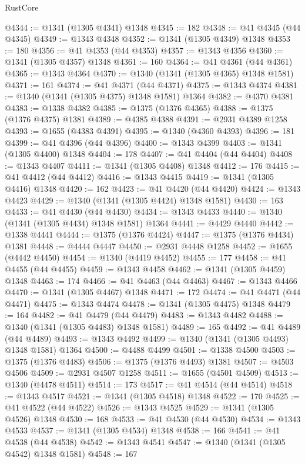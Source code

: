 \begin{lexlean}{RustCore}
\begin{coremodule}
@4344 := @1341 (@1305 @4341) @1348
@4345 := 182
@4348 := @41 @4345 (@44 @4345)
@4349 := @1343 @4348
@4352 := @1341 (@1305 @4349) @1348
@4353 := 180
@4356 := @41 @4353 (@44 @4353)
@4357 := @1343 @4356
@4360 := @1341 (@1305 @4357) @1348
@4361 := 160
@4364 := @41 @4361 (@44 @4361)
@4365 := @1343 @4364
@4370 := @1340 (@1341 (@1305 @4365) @1348 @1581)
@4371 := 161
@4374 := @41 @4371 (@44 @4371)
@4375 := @1343 @4374
@4381 := @1340 (@1341 (@1305 @4375) @1348 @1581) @1364
@4382 := @4370 @4381
@4383 := @1338 @4382
@4385 := @1375 (@1376 @4365)
@4388 := @1375 (@1376 @4375) @1381
@4389 := @4385 @4388
@4391 := @2931 @4389 @1258
@4393 := @1655 (@4383 @4391)
@4395 := @1340 (@4360 @4393)
@4396 := 181
@4399 := @41 @4396 (@44 @4396)
@4400 := @1343 @4399
@4403 := @1341 (@1305 @4400) @1348
@4404 := 178
@4407 := @41 @4404 (@44 @4404)
@4408 := @1343 @4407
@4411 := @1341 (@1305 @4408) @1348
@4412 := 176
@4415 := @41 @4412 (@44 @4412)
@4416 := @1343 @4415
@4419 := @1341 (@1305 @4416) @1348
@4420 := 162
@4423 := @41 @4420 (@44 @4420)
@4424 := @1343 @4423
@4429 := @1340 (@1341 (@1305 @4424) @1348 @1581)
@4430 := 163
@4433 := @41 @4430 (@44 @4430)
@4434 := @1343 @4433
@4440 := @1340 (@1341 (@1305 @4434) @1348 @1581) @1364
@4441 := @4429 @4440
@4442 := @1338 @4441
@4444 := @1375 (@1376 @4424)
@4447 := @1375 (@1376 @4434) @1381
@4448 := @4444 @4447
@4450 := @2931 @4448 @1258
@4452 := @1655 (@4442 @4450)
@4454 := @1340 (@4419 @4452)
@4455 := 177
@4458 := @41 @4455 (@44 @4455)
@4459 := @1343 @4458
@4462 := @1341 (@1305 @4459) @1348
@4463 := 174
@4466 := @41 @4463 (@44 @4463)
@4467 := @1343 @4466
@4470 := @1341 (@1305 @4467) @1348
@4471 := 172
@4474 := @41 @4471 (@44 @4471)
@4475 := @1343 @4474
@4478 := @1341 (@1305 @4475) @1348
@4479 := 164
@4482 := @41 @4479 (@44 @4479)
@4483 := @1343 @4482
@4488 := @1340 (@1341 (@1305 @4483) @1348 @1581)
@4489 := 165
@4492 := @41 @4489 (@44 @4489)
@4493 := @1343 @4492
@4499 := @1340 (@1341 (@1305 @4493) @1348 @1581) @1364
@4500 := @4488 @4499
@4501 := @1338 @4500
@4503 := @1375 (@1376 @4483)
@4506 := @1375 (@1376 @4493) @1381
@4507 := @4503 @4506
@4509 := @2931 @4507 @1258
@4511 := @1655 (@4501 @4509)
@4513 := @1340 (@4478 @4511)
@4514 := 173
@4517 := @41 @4514 (@44 @4514)
@4518 := @1343 @4517
@4521 := @1341 (@1305 @4518) @1348
@4522 := 170
@4525 := @41 @4522 (@44 @4522)
@4526 := @1343 @4525
@4529 := @1341 (@1305 @4526) @1348
@4530 := 168
@4533 := @41 @4530 (@44 @4530)
@4534 := @1343 @4533
@4537 := @1341 (@1305 @4534) @1348
@4538 := 166
@4541 := @41 @4538 (@44 @4538)
@4542 := @1343 @4541
@4547 := @1340 (@1341 (@1305 @4542) @1348 @1581)
@4548 := 167

\end{coremodule}
\end{lexlean}
